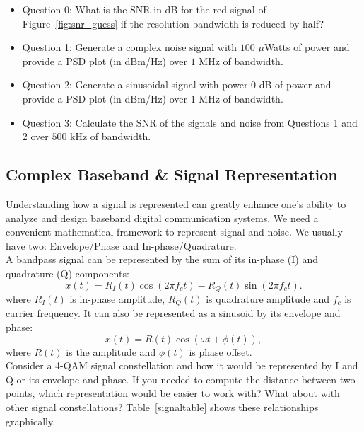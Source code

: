 \documentclass[letterpaper,12pt]{article}
\begin{document}
\begin{itemize}
  \item Question 0: What is the SNR in dB for the red signal of Figure~\ref{fig:snr_guess} if the resolution bandwidth is reduced by half?
  \item Question 1: Generate a complex noise signal with $100\,\,\mu$Watts of power and provide a PSD plot (in dBm/Hz) over $1$ MHz of bandwidth.
  \item Question 2: Generate a sinusoidal signal with power $0$ dB of power and provide a PSD plot (in dBm/Hz) over $1$ MHz of bandwidth.
  \item Question 3: Calculate the SNR of the signals and noise from Questions 1 and 2 over $500$ kHz of bandwidth.
\end{itemize}

\subsection{Complex Baseband \& Signal Representation}
Understanding how a signal is represented can greatly enhance one's
ability to analyze and design baseband digital communication
systems. We need a convenient
mathematical framework to represent signal and noise. We usually have two: Envelope/Phase and In-phase/Quadrature.\\

\noindent
A bandpass signal can be represented by the sum of its in-phase (I) and quadrature (Q) components:
\begin{equation}
x(t) = R_{I}(t)\cos{(2{\pi}f_{c}t)}-R_{Q}(t)\sin{(2{\pi}f_{c}t)}.
\end{equation}
where $R_{I}(t)$ is in-phase amplitude, $R_{Q}(t)$ is quadrature amplitude and $f_{c}$ is carrier frequency.
It can also be represented as a sinusoid by its envelope and phase:
\begin{equation}
x(t) = R(t)\cos{({\omega}t+{\phi}(t))},
\end{equation}
where $R(t)$ is the amplitude and ${\phi}(t)$ is phase offset.\\

\noindent Consider a 4-QAM signal constellation and how it would be
represented by I and Q or its envelope and phase. If you needed to
compute the distance between two points, which representation would
be easier to work with?  What about with other signal
constellations?  Table~\ref{signaltable} shows these relationships
graphically.\\
\end{document}
